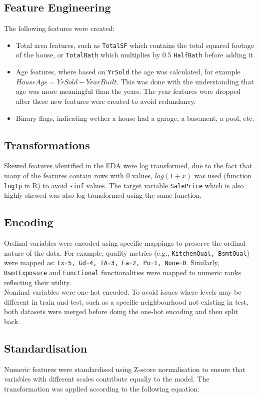 \documentclass[12pt,oneside]{article} %
\begin{document}
\subsection{Feature Engineering}

The following features were created:
\begin{itemize}
    \item Total area features, such as \texttt{TotalSF} which contains the total squared footage of the house, or \texttt{TotalBath} which multiplies by 0.5 \texttt{HalfBath} before adding it.
    \item Age features, where based on \texttt{YrSold} the age was calculated, for example $HouseAge = YrSold - YearBuilt$. This was done with the understanding that age was more meaningful than the years. The year features were dropped after these new features were created to avoid redundancy.
    \item Binary flags, indicating wether a house had a garage, a basement, a pool, etc.
\end{itemize}

\subsection{Transformations}
Skewed features identified in the EDA were log transformed, due to the fact that many of the features contain rows with 0 values, $log(1+x)$ was used (function \texttt{log1p} in R) to avoid \texttt{-inf} values. The target variable \texttt{SalePrice} which is also highly skewed was also log transformed using the same function.

\subsection{Encoding}
Ordinal variables were encoded using specific mappings to preserve the ordinal nature of the data. For example, quality metrics (e.g., \texttt{KitchenQual, BsmtQual}) were mapped as: \texttt{Ex=5, Gd=4, TA=3, Fa=2, Po=1, None=0}. Similarly, \texttt{BsmtExposure} and \texttt{Functional} functionalities were mapped to numeric ranks reflecting their utility.\\

\noindent
Nominal variables were one-hot encoded. To avoid issues where levels may be different in train and test, such as a specific neighbourhood not existing in test, both datasets were merged before doing the one-hot encoding and then split back.

\subsection{Standardisation}
Numeric features were standardised using Z-score normalisation to ensure that variables with different scales contribute equally to the model. The transformation was applied according to the following equation:
\end{document}

